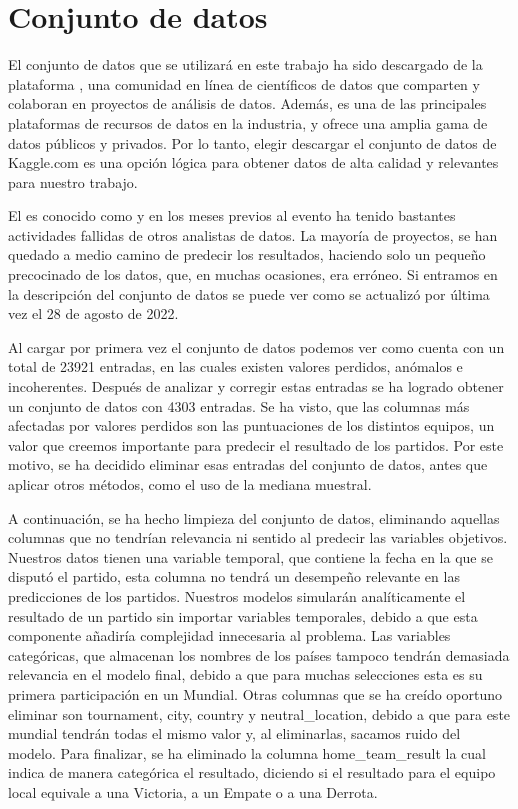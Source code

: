 \section{Conjunto de datos}

El conjunto de datos que se utilizará en este trabajo ha sido descargado de la plataforma \cite{Kaggle.com}, una comunidad en línea de científicos de datos que comparten y colaboran en proyectos de análisis de datos. Además, es una de las principales plataformas de recursos de datos en la industria, y ofrece una amplia gama de datos públicos y privados. Por lo tanto, elegir descargar el conjunto de datos de Kaggle.com es una opción lógica para obtener datos de alta calidad y relevantes para nuestro trabajo.
\newline

El \cite{FIFA World Cup 2022 Dataset} es conocido como \cite{FIFA World Cup 2022} y en los meses previos al evento ha tenido bastantes actividades fallidas de otros analistas de datos. La mayoría de proyectos, se han quedado a medio camino de predecir los resultados, haciendo solo un pequeño precocinado de los datos, que, en muchas ocasiones, era erróneo. Si entramos en la descripción del conjunto de datos se puede ver como se actualizó por última vez el 28 de agosto de 2022.
\newline

Al cargar por primera vez el conjunto de datos podemos ver como cuenta con un total de 23921 entradas, en las cuales existen valores perdidos, anómalos e incoherentes. Después de analizar y corregir estas entradas se ha logrado obtener un conjunto de datos con 4303 entradas. Se ha visto, que las columnas más afectadas por valores perdidos son las puntuaciones de los distintos equipos, un valor que creemos importante para predecir el resultado de los partidos. Por este motivo, se ha decidido eliminar esas entradas del conjunto de datos, antes que aplicar otros métodos, como el uso de la mediana muestral.
\newline

A continuación, se ha hecho limpieza del conjunto de datos, eliminando aquellas columnas que no tendrían relevancia ni sentido al predecir las variables objetivos. Nuestros datos tienen una variable temporal, que contiene la fecha en la que se disputó el partido, esta columna no tendrá un desempeño relevante en las predicciones de los partidos. Nuestros modelos simularán analíticamente el resultado de un partido sin importar variables temporales, debido a que esta componente añadiría complejidad innecesaria al problema. Las variables categóricas, que almacenan los nombres de los países tampoco tendrán demasiada relevancia en el modelo final, debido a que para muchas selecciones esta es su primera participación en un Mundial. Otras columnas que se ha creído oportuno eliminar son tournament, city, country y neutral\_location, debido a que para este mundial tendrán todas el mismo valor y, al eliminarlas, sacamos ruido del modelo. Para finalizar, se ha eliminado la columna home\_team\_result la cual indica de manera categórica el resultado, diciendo si el resultado para el equipo local equivale a una Victoria, a un Empate o a una Derrota.
\newline

